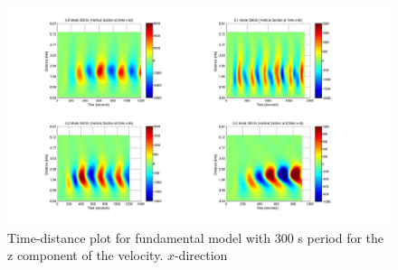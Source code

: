 \documentclass[preprint,authoryear,12pt]{elsarticle}
\begin{document}

\begin{figure}[h]
\includegraphics[scale=0.3]{imrescale/dt_300_vert_x.jpg}
\caption{Time-distance plot for fundamental model with 300 s period for the z component of the velocity. $x$-direction }
\label{Fig7}
\end{figure}






\end{document}
